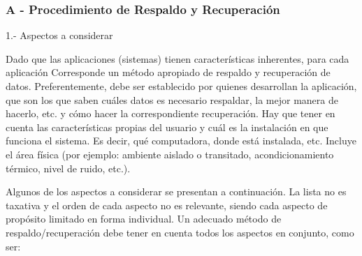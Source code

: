 \subsubsection{A - Procedimiento de Respaldo y Recuperación} 

1.- Aspectos a considerar

Dado que las aplicaciones (sistemas) tienen características inherentes, para cada aplicación
Corresponde un método apropiado de respaldo y recuperación de datos. Preferentemente, debe ser establecido por quienes desarrollan la aplicación, que son los que saben cuáles datos es necesario respaldar, la mejor manera de hacerlo, etc. y cómo hacer la correspondiente recuperación. Hay que tener en cuenta las características propias del usuario y cuál es la instalación en que funciona el sistema. Es decir, qué computadora, donde está instalada, etc. Incluye el área física (por ejemplo: ambiente aislado o transitado, acondicionamiento térmico, nivel de ruido, etc.).  

Algunos de los aspectos a considerar se presentan a continuación. La lista no es taxativa y el orden de cada aspecto no es relevante, siendo cada aspecto de propósito limitado en forma individual. Un adecuado método de respaldo/recuperación debe tener en cuenta todos los aspectos en conjunto, como ser: 

